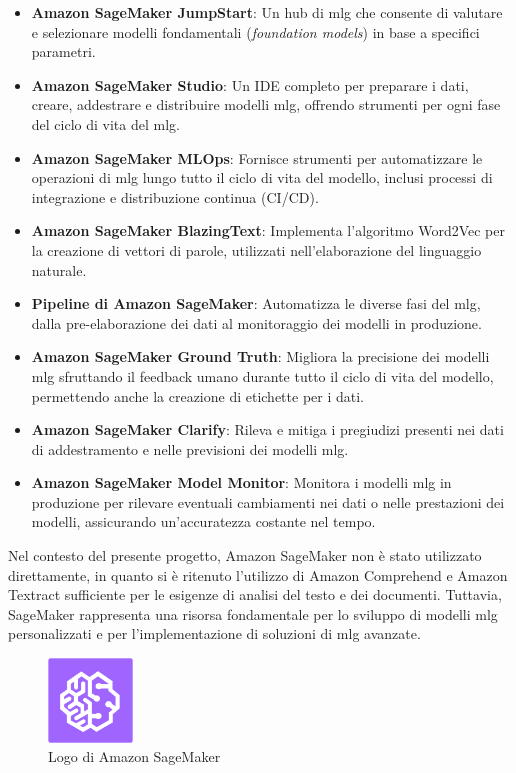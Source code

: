 \begin{itemize}
    \item \textbf{Amazon SageMaker JumpStart}: Un hub di \gls{mlg} che consente di valutare e selezionare modelli fondamentali (\textit{foundation models}) in base a specifici parametri.
    \item \textbf{Amazon SageMaker Studio}: Un IDE completo per preparare i dati, creare, addestrare e distribuire modelli \gls{mlg}, offrendo strumenti per ogni fase del ciclo di vita del \gls{mlg}.
    \item \textbf{Amazon SageMaker MLOps}: Fornisce strumenti per automatizzare le operazioni di \gls{mlg} lungo tutto il ciclo di vita del modello, inclusi processi di integrazione e distribuzione continua (CI/CD).
    \item \textbf{Amazon SageMaker BlazingText}: Implementa l'algoritmo Word2Vec per la creazione di vettori di parole, utilizzati nell'elaborazione del linguaggio naturale.
    \item \textbf{Pipeline di Amazon SageMaker}: Automatizza le diverse fasi del \gls{mlg}, dalla pre-elaborazione dei dati al monitoraggio dei modelli in produzione.
    \item \textbf{Amazon SageMaker Ground Truth}: Migliora la precisione dei modelli \gls{mlg} sfruttando il feedback umano durante tutto il ciclo di vita del modello, permettendo anche la creazione di etichette per i dati.
    \item \textbf{Amazon SageMaker Clarify}: Rileva e mitiga i pregiudizi presenti nei dati di addestramento e nelle previsioni dei modelli \gls{mlg}.
    \item \textbf{Amazon SageMaker Model Monitor}: Monitora i modelli \gls{mlg} in produzione per rilevare eventuali cambiamenti nei dati o nelle prestazioni dei modelli, assicurando un'accuratezza costante nel tempo.
\end{itemize}

Nel contesto del presente progetto, Amazon SageMaker non è stato utilizzato direttamente, in quanto si è ritenuto l'utilizzo di Amazon Comprehend e Amazon Textract sufficiente per le esigenze di analisi del testo e dei documenti. Tuttavia, SageMaker rappresenta una risorsa fondamentale per lo sviluppo di modelli \gls{mlg} personalizzati e per l'implementazione di soluzioni di \gls{mlg} avanzate.
\begin{figure}[h]
  \centering
  \includegraphics[width=0.2\textwidth]{img/tecnologie/sagemaker.png}
  \caption{Logo di Amazon SageMaker}
  \label{fig:sagemaker}
\end{figure}

